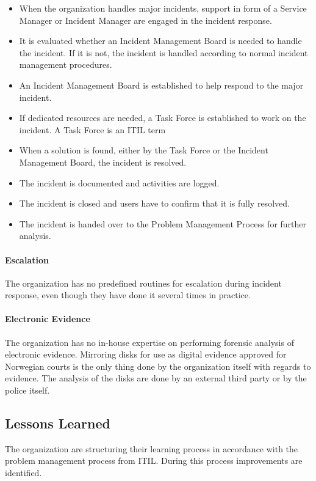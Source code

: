 \begin{itemize}
\item When the organization handles major incidents, support in form of a Service Manager or Incident Manager are engaged in the incident response.
\item It is evaluated whether an Incident Management Board is needed to handle the incident. If it is not, the incident is handled according to normal incident management procedures.
\item An Incident Management Board is established to help respond to the major incident.
\item If dedicated resources are needed, a Task Force is established to work on the incident. A Task Force is an ITIL term
\item When a solution is found, either by the Task Force or the Incident Management Board, the incident is resolved.
\item The incident is documented and activities are logged.
\item The incident is closed and users have to confirm that it is fully resolved.
\item The incident is handed over to the Problem Management Process for further analysis.  
\end{itemize}


\paragraph{Escalation}
The organization has no predefined routines for escalation during incident response, even though they have done it several times in practice.

\paragraph{Electronic Evidence}
The organization has no in-house expertise on performing forensic analysis of electronic evidence. Mirroring disks for use as digital evidence approved for Norwegian courts is the only thing done by the organization itself with regards to evidence. The analysis of the disks are done by an external third party or by the police itself.

\subsection{Lessons Learned}
The organization are structuring their learning process in accordance with the problem management process from ITIL. During this process improvements are identified. 

